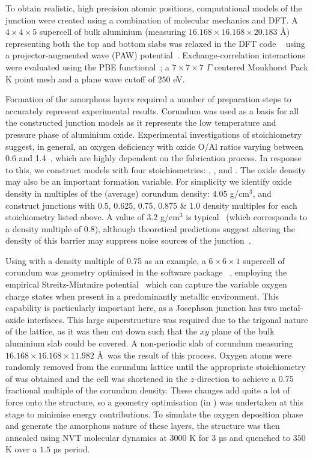 To obtain realistic, high precision atomic positions, computational models of the junction were created using a combination of molecular mechanics and DFT.
A $4\!\times\!4\!\times\!5$ supercell of bulk aluminium (measuring $16.168\times16.168\times20.183$ \AA) representing both the top and bottom slabs was relaxed in the DFT code ~\cite{Kresse1994, Kresse1996, Kresse1996a} using a projector-augmented wave (PAW) potential~\cite{Kresse1999, Blochl1994}.
Exchange-correlation interactions were evaluated using the PBE functional~\cite{Perdew1996}; a $7\!\times\!7\!\times\!7$ $\Gamma$ centered Monkhorst Pack K point mesh and a plane wave cutoff of $250$ eV.

Formation of the amorphous  layers required a number of preparation steps to accurately represent experimental results.
Corundum was used as a basis for all the constructed junction models as it represents the low temperature and pressure phase of aluminium oxide.
Experimental investigations of stoichiometry suggest, in general, an oxygen deficiency with oxide O/Al ratios varying between 0.6 and 1.4~\cite{Tan2005}, which are highly dependent on the fabrication process.
In response to this, we construct models with four stoichiometries: , ,  and .
The oxide density may also be an important formation variable.
For simplicity we identify oxide density in multiples of the (average) corundum density: $4.05$ g/cm$^\text{3}$, and construct junctions with 0.5, 0.625, 0.75, 0.875 \& 1.0 density multiples for each stoichiometry listed above.
A value of $3.2$ g/cm$^\text{3}$ is typical~\cite{Barbour1998} (which corresponds to a density multiple of 0.8), although theoretical predictions suggest altering the density of this barrier may suppress noise sources of the junction~\cite{DuBois2013}.

Using  with a density multiple of 0.75 as an example, a $6\!\times\!6\!\times\!1$ supercell of corundum was geometry optimised in the software package ~\cite{Gale2003}, employing the empirical Streitz-Mintmire potential~\cite{Streitz1994} which can capture the variable oxygen charge states when present in a predominantly metallic environment. This capability is particularly important here, as a Josephson junction has two metal-oxide interfaces.
This large superstructure was required due to the trigonal nature of the lattice, as it was then cut down such that the $xy$ plane of the bulk aluminium slab could be covered.
A non-periodic slab of corundum measuring $16.168\!\times\!16.168\!\times\!11.982$ \AA\ was the result of this process.
Oxygen atoms were randomly removed from the corundum lattice until the appropriate stoichiometry of  was obtained and the cell was shortened in the $z$-direction to achieve a 0.75 fractional multiple of the corundum density.
These changes add quite a lot of force onto the structure, so a geometry optimisation (in ) was undertaken at this stage to minimise energy contributions.
To simulate the oxygen deposition phase and generate the amorphous nature of these layers, the structure was then annealed using NVT molecular dynamics at $3000$ K for $3$ µs and quenched to $350$ K over a $1.5$ µs period.

